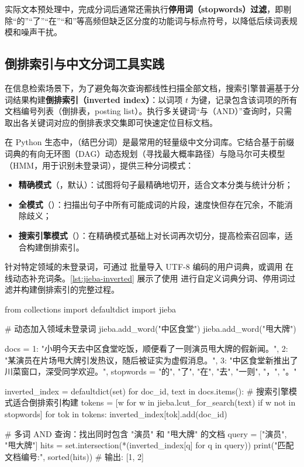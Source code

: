 实际文本预处理中，完成分词后通常还需执行\textbf{停用词（stopwords）过滤}，即剔除“的”“了”“在”“和”等高频但缺乏区分度的功能词与标点符号，以降低后续词表规模和噪声干扰。

\subsection{倒排索引与中文分词工具实践}

在信息检索场景下，为了避免每次查询都线性扫描全部文档，搜索引擎普遍基于分词结果构建\textbf{倒排索引（inverted index）}：以词项 $t$ 为键，记录包含该词项的所有文档编号列表（倒排表，posting list）。执行多关键词“与（AND）”查询时，只需取出各关键词对应的倒排表求交集即可快速定位目标文档。

在 Python 生态中，（结巴分词）是最常用的轻量级中文分词库。它结合基于前缀词典的有向无环图（DAG）动态规划（寻找最大概率路径）与隐马尔可夫模型（HMM，用于识别未登录词），提供三种分词模式：
\begin{itemize}
  \item \textbf{精确模式}（，默认）：试图将句子最精确地切开，适合文本分类与统计分析；
  \item \textbf{全模式}（）：扫描出句子中所有可能成词的片段，速度快但存在冗余，不能消除歧义；
  \item \textbf{搜索引擎模式}（）：在精确模式基础上对长词再次切分，提高检索召回率，适合构建倒排索引。
\end{itemize}

针对特定领域的未登录词，可通过  批量导入 UTF-8 编码的用户词典，或调用  在线动态补充词条。\cref{lst:jieba-inverted} 展示了使用  进行自定义词典分词、停用词过滤并构建倒排索引的完整过程。

\begin{codeblock}[language=Python, caption={使用 jieba 进行中文分词、自定义词典与倒排索引构建}, label={lst:jieba-inverted}]
from collections import defaultdict
import jieba

# 动态加入领域未登录词
jieba.add_word("中区食堂")
jieba.add_word("甩大牌")

docs = {
    1: "小明今天去中区食堂吃饭，顺便看了一则演员甩大牌的假新闻。",
    2: "某演员在片场甩大牌引发热议，随后被证实为虚假消息。",
    3: "中区食堂新推出了川菜窗口，深受同学欢迎。",
}
stopwords = {"的", "了", "在", "去", "一则", "，", "。"}

inverted_index = defaultdict(set)
for doc_id, text in docs.items():
    # 搜索引擎模式适合倒排索引构建
    tokens = [w for w in jieba.lcut_for_search(text) if w not in stopwords]
    for tok in tokens:
        inverted_index[tok].add(doc_id)

# 多词 AND 查询：找出同时包含 "演员" 和 "甩大牌" 的文档
query = ["演员", "甩大牌"]
hits = set.intersection(*(inverted_index[q] for q in query))
print("匹配文档编号:", sorted(hits))  # 输出: [1, 2]
\end{codeblock}

